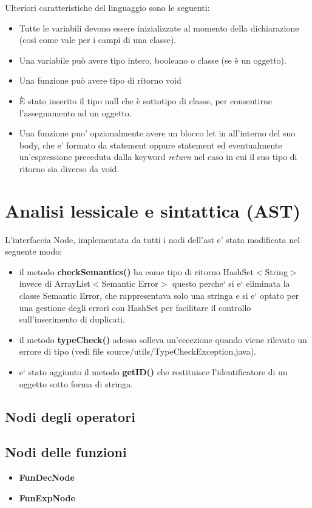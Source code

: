 \documentclass[a4paper]{article}   %
\begin{document}
Ulteriori caratteristiche del linguaggio sono le seguenti:\\
\begin{itemize}
  \item Tutte le variabili devono essere inizializzate al momento della dichiarazione (così come vale
 per i campi di una classe).
  \item Una variabile può avere tipo intero, booleano o classe (se è un oggetto).
  \item Una funzione può avere tipo di ritorno void
  \item È stato inserito il tipo null che è sottotipo di classe, per consentirne l'assegnamento ad un oggetto.
  \item Una funzione puo' opzionalmente avere un blocco let in all'interno del suo body, che e' formato da
  statement oppure statement ed eventualmente un'espressione preceduta dalla keyword \textit{return} nel caso in
  cui il suo tipo di ritorno sia diverso da void.
\end{itemize}

\section{Analisi lessicale e sintattica (AST)}
L'interfaccia Node, implementata da tutti i nodi dell'ast e' stata modificata nel seguente modo:\\
\begin{itemize}
  \item il metodo \textbf{checkSemantics()} ha come tipo di ritorno HashSet$<$String$>$ invece di ArrayList$<$Semantic Error$>$
  questo perche` si e` eliminata la classe Semantic Error, che rappresentava solo una stringa e si e`
  optato per una gestione degli errori con HashSet per facilitare il controllo sull'inserimento
  di duplicati.
  \item il metodo \textbf{typeCheck()} adesso solleva un'eccezione quando viene rilevato un errore di tipo
  (vedi file source/utils/TypeCheckException.java).
  \item e` stato aggiunto il metodo \textbf{getID()} che restituisce l'identificatore di un oggetto sotto forma di stringa.
\end{itemize}

\subsection{Nodi degli operatori}
\subsection{Nodi delle funzioni}
\begin{itemize}
  \item \textbf{FunDecNode}
  \item \textbf{FunExpNode}
\end{itemize}
\end{document}
